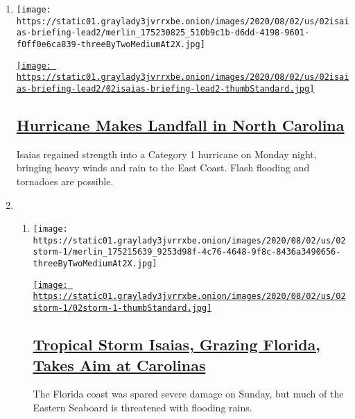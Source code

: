 \begin{enumerate}
\def\labelenumi{\arabic{enumi}.}
\item
  \texttt{[image: https://static01.graylady3jvrrxbe.onion/images/2020/08/02/us/02isaias-briefing-lead2/merlin\_175230825\_510b9c1b-d6dd-4198-9601-f0ff0e6ca839-threeByTwoMediumAt2X.jpg]}

  \href{/2020/08/03/us/isaias-storm-updates.html}{\texttt{[image: https://static01.graylady3jvrrxbe.onion/images/2020/08/02/us/02isaias-briefing-lead2/02isaias-briefing-lead2-thumbStandard.jpg]}}

  \hypertarget{hurricane-makes-landfall-in-north-carolina}{%
  \subsection{\texorpdfstring{\href{/2020/08/03/us/isaias-storm-updates.html}{Hurricane
  Makes Landfall in North
  Carolina}}{Hurricane Makes Landfall in North Carolina}}\label{hurricane-makes-landfall-in-north-carolina}}

  Isaias regained strength into a Category 1 hurricane on Monday night,
  bringing heavy winds and rain to the East Coast. Flash flooding and
  tornadoes are possible.
\item
  \begin{enumerate}
  \def\labelenumii{\arabic{enumii}.}
  \item
    \texttt{[image: https://static01.graylady3jvrrxbe.onion/images/2020/08/02/us/02storm-1/merlin\_175215639\_9253d98f-4c76-4648-9f8c-8436a3490656-threeByTwoMediumAt2X.jpg]}

    \href{/2020/08/02/us/tropical-storm-isaias-florida-carolina.html}{\texttt{[image: https://static01.graylady3jvrrxbe.onion/images/2020/08/02/us/02storm-1/02storm-1-thumbStandard.jpg]}}

    \hypertarget{tropical-storm-isaias-grazing-florida-takes-aim-at-carolinas}{%
    \subsection{\texorpdfstring{\href{/2020/08/02/us/tropical-storm-isaias-florida-carolina.html}{Tropical
    Storm Isaias, Grazing Florida, Takes Aim at
    Carolinas}}{Tropical Storm Isaias, Grazing Florida, Takes Aim at Carolinas}}\label{tropical-storm-isaias-grazing-florida-takes-aim-at-carolinas}}

    The Florida coast was spared severe damage on Sunday, but much of
    the Eastern Seaboard is threatened with flooding rains.


\end{enumerate}
\end{enumerate}

